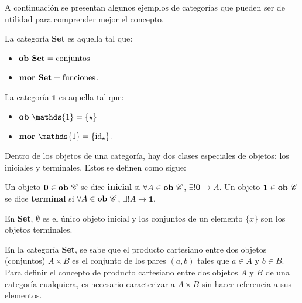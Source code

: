 A continuación se presentan algunos ejemplos de categorías que pueden ser de utilidad para comprender mejor el concepto.

\begin{ejemplo}
La categoría \textbf{Set} es aquella tal que:
\begin{itemize}[noitemsep,label=$\blacktriangleright$]
	\item $\text{\bf ob Set} = \text{conjuntos}$
	\item $\text{\bf mor Set} = \text{funciones}$. 
\end{itemize}
\end{ejemplo}
\begin{ejemplo}
La categoría $\mathds{1}$ es aquella tal que:
\begin{itemize}[noitemsep,label=$\blacktriangleright$]
	\item $\text{\bf ob} \ \mathds{1} = \{\star\}$
	\item $\text{\bf mor} \ \mathds{1} = \{\text{id}_{\star}\}$. 
\end{itemize}
\end{ejemplo}

Dentro de los objetos de una categoría, hay dos clases especiales de objetos: los iniciales y terminales. Estos se definen como sigue:

\begin{definition}
Un objeto $\mathbf{0} \in \text{\bf ob} \ \mathscr{C}$ se dice \textbf{inicial} si $\forall A \in \text{\bf ob} \ \mathscr{C}$, $\exists! \mathbf{0} \rightarrow A$. 
Un objeto $\mathbf{1} \in \text{\bf ob} \ \mathscr{C}$ se dice \textbf{terminal} si $\forall A \in \text{\bf ob} \ \mathscr{C}$, $\exists! A \rightarrow \mathbf{1}$.
\end{definition}

\begin{ejemplo} 
En \textbf{Set}, $\emptyset$ es el único objeto inicial y los conjuntos de un elemento $\{x\}$ son los objetos terminales.
\end{ejemplo}

En la categoría \textbf{Set}, se sabe que el producto cartesiano entre dos objetos (conjuntos) $A \times B$ es el conjunto de los pares $(a,b)$ tales que $a \in A$ y $b \in B$. Para definir el concepto de producto cartesiano entre dos objetos $A$ y $B$ de una categoría cualquiera, es necesario caracterizar a $A \times B$ sin hacer referencia a sus elementos. 

